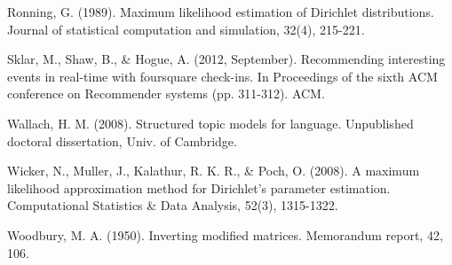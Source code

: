 \documentclass[twoside]{article}
\begin{document}
\begin{thebibliography}{20}
Ronning, G. (1989). Maximum likelihood estimation of Dirichlet distributions. Journal of statistical computation and simulation, 32(4), 215-221.

Sklar, M., Shaw, B., \& Hogue, A. (2012, September). Recommending interesting events in real-time with foursquare check-ins. In Proceedings of the sixth ACM conference on Recommender systems (pp. 311-312). ACM.

Wallach, H. M. (2008). Structured topic models for language. Unpublished doctoral dissertation, Univ. of Cambridge.

Wicker, N., Muller, J., Kalathur, R. K. R., \& Poch, O. (2008). A maximum likelihood approximation method for Dirichlet's parameter estimation. Computational Statistics \& Data Analysis, 52(3), 1315-1322.

Woodbury, M. A. (1950). Inverting modified matrices. Memorandum report, 42, 106.

\end{thebibliography}
\end{document}
